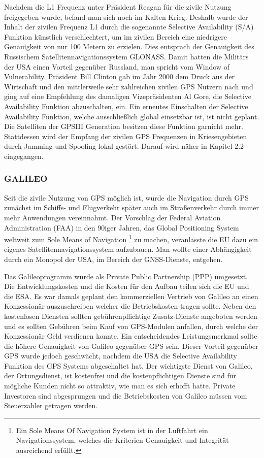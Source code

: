 \documentclass[letterpaper,11pt,ngerman]{andi}
\begin{document}
Nachdem die L1 Frequenz unter Präsident Reagan für die zivile Nutzung freigegeben wurde, befand man sich noch im Kalten Krieg. Deshalb wurde der Inhalt der zivilen Frequenz L1 durch die sogenannte Selective Availability (S/A) Funktion künstlich verschlechtert, um im zivilen Bereich eine niedrigere Genauigkeit von nur 100 Metern zu erzielen. Dies entsprach der Genauigkeit des Russischem Satellitennavigationssystem GLONASS. Damit hatten die Militärs der USA einen Vorteil gegenüber Russland, man spricht vom Window of Vulnerability. Präsident Bill Clinton gab im Jahr 2000 dem Druck aus der Wirtschaft und den mittlerweile sehr zahlreichen zivilen GPS Nutzern nach und ging auf eine Empfehlung des damaligen Vizepräsidenten Al Gore, die Selective Availability Funktion abzuschalten, ein. \cite{sat_nav_dodel}
Ein erneutes Einschalten der Selective Availability Funktion, welche ausschließlich global einsetzbar ist, ist nicht geplant. Die Satelliten der GPSIII Generation besitzen diese Funktion garnicht mehr. \cite{sat_nav_dodel} Stattdessen wird der Empfang der zivilen GPS Frequenzen in Kriesengebieten durch Jamming und Spoofing lokal gestört. \cite{sat_nav_schildt} Darauf wird näher in Kapitel 2.2 eingegangen.


\subsubsection{GALILEO}
\label{included_projects/gps/GPS_SPEC/content:galileo}
Seit die zivile Nutzung von GPS möglich ist, wurde die Navigation durch GPS zunächst im Schiffs- und Flugverkehr später auch im Straßenverkehr durch immer mehr Anwendungen vereinnahmt. Der Vorschlag der Federal Aviation Administration (FAA) in den 90iger Jahren, das Global Positioning System weltweit zum Sole Means of Navigation \footnote{
Ein Sole Means Of Navigation System ist in der Luftfahrt ein Navigationssystem, welches die Kriterien Genauigkeit und Integrität ausreichend erfüllt.
} zu machen, veranlasste die EU dazu ein eigenes Satellitennavigationssystem aufzubauen. Man wollte einer Abhängigkeit durch ein Monopol der USA, im Bereich der GNSS-Dienste, entgehen. \cite{sat_nav_dodel}

Das Galileoprogramm wurde als Private Public Partnership (PPP) umgesetzt. Die Entwicklungskosten und die Kosten für den Aufbau teilen sich die EU und die ESA. \cite{sat_nav_dodel} Es war damals geplant den kommerziellen Vertrieb von Galileo an einen Konzessionär auszuschreiben welcher die Betriebskosten tragen sollte. Neben den kostenlosen Diensten sollten gebührenpflichtige Zusatz-Dienste angeboten werden und es sollten Gebühren beim Kauf von GPS-Modulen anfallen, durch welche der Konzessionär Geld verdienen konnte. Ein entscheidendes Leistungsmerkmal sollte die höhere Genauigkeit von Galileo gegenüber GPS sein. Dieser Vorteil gegenüber GPS wurde jedoch geschwächt, nachdem die USA die Selective Availability Funktion des GPS Systems abgeschaltet hat. Der wichtigste Dienst von Galileo, der Ortungsdienst, ist kostenfrei und die kostenpflichtigen Dienste sind für mögliche Kunden nicht so attraktiv, wie man es sich erhofft hatte. Private Investoren sind abgesprungen und die Betriebskosten von Galileo müssen vom Steuerzahler getragen werden.
\end{document}
